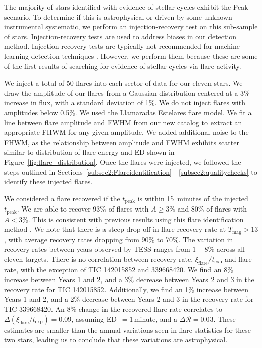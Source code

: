 \documentclass[twocolumn, linenumbers]{aastex631}
\begin{document}
The majority of stars identified with evidence of stellar cycles exhibit the Peak scenario. To determine if this is astrophysical or driven by some unknown instrumental systematic,
we perform an injection-recovery test on this sub-sample of stars. Injection-recovery tests are used to address biases in our detection method.  Injection-recovery tests are typically
not recommended for machine-learning detection techniques \citep{feinstein20}. However, we perform them because these are some of the first results of searching for evidence of stellar
cycles via flare activity.

We inject a total of 50 flares into each sector of data for our eleven stars. We draw the amplitude of our flares from a Gaussian distribution centered at a 3\% increase in flux, with a
standard deviation of 1\%. We do not inject flares with amplitudes below 0.5\%. We used the Llamaradas Estelares flare model. We fit a line between flare amplitude and FWHM from our new
catalog to extract an appropriate FHWM for any given amplitude. We added additional noise to the FHWM, as the relationship between amplitude and FWHM exhibits scatter similar to
distribution of flare energy and ED shown in Figure~\ref{fig:flare_distribution}. Once the flares were injected, we followed the steps outlined in
Sections~\ref{subsec2:Flareidentification} - \ref{subsec2:qualitychecks} to identify these injected flares.

We considered a flare recovered if the $t_\textrm{peak}$ is within 15~minutes of the injected $t_\textrm{peak}$. We are able to recover 93\% of flares with $A \geq 3$\% and 80\% of flares
with $A < 3$\%. This is consistent with previous results using this flare identification method \citep{feinstein20}. We note that there is a steep drop-off in flare recovery rate at
$T_\textrm{mag} > 13$,  with average recovery rates dropping from  90\% to 70\%.  The variation in recovery rates between years observed by TESS ranges from $1 - 8$\% across all eleven
targets. There is no correlation between recovery rate,  $\xi_\textrm{flare}/t_\textrm{exp}$ and flare rate, with the exception of TIC 142015852 and 339668420. We find an 8\% increase
between Years 1 and 2, and a 3\% decrease between Years 2 and 3 in the recovery rate for TIC 142015852. Additionally, we find an 1\% increase between Years 1 and 2, and a 2\% decrease
between Years 2 and 3 in the recovery rate for TIC 339668420. An 8\% change in the recovered flare rate correlates to $\Delta (\xi_\textrm{flare} / t_\textrm{exp}) = 0.09$, assuming
ED~$= 1$\,minute, and a $\Delta \mathcal{R} = 0.03$. These estimates are smaller than the annual variations seen in flare statistics for these two stars, leading us to conclude that these
variations are astrophysical.
\end{document}
